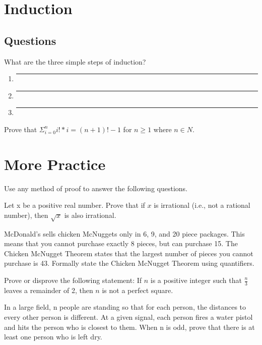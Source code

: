\documentclass{exam}
\newcommand{\HRule}[1][\medskipamount]{\par
  \vspace*{\dimexpr-\parskip-\baselineskip+#1}
  \noindent\rule{\linewidth}{0.2mm}\par}
\begin{document}
\section{Induction}
\subsection{Questions}
\begin{questions}
\item What are the three simple steps of induction?
\begin{enumerate}
\item \HRule[35pt]
\item \HRule[35pt]
\item \HRule[35pt]
\end{enumerate}
\vspace{10 mm}
\item Prove that $\Sigma_{i=0}^{n} i!*i = (n+1)! - 1$  for $n \geq 1$ where $n \in N$.
\end{questions}
\clearpage

\section{More Practice}
Use any method of proof to answer the following questions.
\begin{questions}
\item Let x be a positive real number. Prove that if $x$ is irrational (i.e., not a rational number), then $\sqrt{x}$ is also irrational.
\vspace{80 mm}
\item McDonald’s sells chicken McNuggets only in 6, 9, and 20 piece packages. This means that you cannot purchase exactly 8 pieces, but can purchase 15. The Chicken McNugget Theorem states that the largest number of pieces you cannot purchase is 43. Formally state the Chicken McNugget Theorem using quantifiers.
\clearpage
\item Prove or disprove the following statement: If $n$ is a positive integer such that $\frac{n}{3}$ leaves a remainder of 2, then $n$ is not a perfect square.
\vspace{80 mm}
\item In a large field, n people are standing so that for each person, the distances to every other person is different. At a given signal, each person fires a water pistol and hits the person who is closest to them. When n is odd, prove that there is at least one person who is left dry.
\end{questions}
\end{document}
